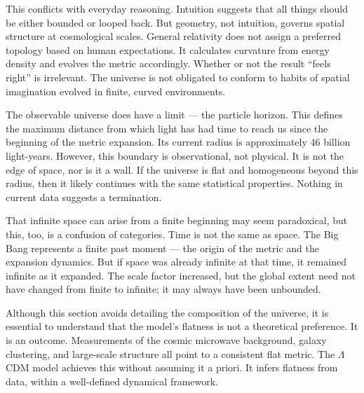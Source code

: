 This conflicts with everyday reasoning. Intuition suggests that all things should be either bounded or looped back. But geometry, not intuition, governs spatial structure at cosmological scales. General relativity does not assign a preferred topology based on human expectations. It calculates curvature from energy density and evolves the metric accordingly. Whether or not the result “feels right” is irrelevant. The universe is not obligated to conform to habits of spatial imagination evolved in finite, curved environments.

The observable universe does have a limit — the particle horizon. This defines the maximum distance from which light has had time to reach us since the beginning of the metric expansion. Its current radius is approximately 46 billion light-years. However, this boundary is observational, not physical. It is not the edge of space, nor is it a wall. If the universe is flat and homogeneous beyond this radius, then it likely continues with the same statistical properties. Nothing in current data suggests a termination.

That infinite space can arise from a finite beginning may seem paradoxical, but this, too, is a confusion of categories. Time is not the same as space. The Big Bang represents a finite past moment — the origin of the metric and the expansion dynamics. But if space was already infinite at that time, it remained infinite as it expanded. The scale factor increased, but the global extent need not have changed from finite to infinite; it may always have been unbounded.

Although this section avoids detailing the composition of the universe, it is essential to understand that the model's flatness is not a theoretical preference. It is an outcome. Measurements of the cosmic microwave background, galaxy clustering, and large-scale structure all point to a consistent flat metric. The $\Lambda$CDM model achieves this without assuming it a priori. It infers flatness from data, within a well-defined dynamical framework.

